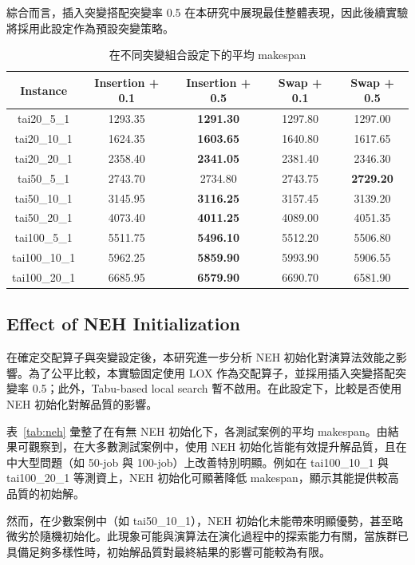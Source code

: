 \documentclass[conference]{IEEEtran}
\begin{document}
綜合而言，插入突變搭配突變率 0.5 在本研究中展現最佳整體表現，因此後續實驗將採用此設定作為預設突變策略。
\begin{table}[H]
\centering
\caption{在不同突變組合設定下的平均 makespan}
\label{tab:mutation_settings}
\begin{tabular}{c|c|c|c|c}
\hline
Instance & Insertion + 0.1 & Insertion + 0.5 & Swap + 0.1 & Swap + 0.5 \\
\hline
tai20\_5\_1   & 1293.35 & \textbf{1291.30} & 1297.80 & 1297.00 \\
tai20\_10\_1  & 1624.35 & \textbf{1603.65} & 1640.80 & 1617.65 \\
tai20\_20\_1  & 2358.40 & \textbf{2341.05} & 2381.40 & 2346.30 \\
tai50\_5\_1   & 2743.70 & 2734.80 & 2743.75 & \textbf{2729.20} \\
tai50\_10\_1  & 3145.95 & \textbf{3116.25} & 3157.45 & 3139.20 \\
tai50\_20\_1  & 4073.40 & \textbf{4011.25} & 4089.00 & 4051.35 \\
tai100\_5\_1  & 5511.75 & \textbf{5496.10} & 5512.20 & 5506.80 \\
tai100\_10\_1 & 5962.25 & \textbf{5859.90} & 5993.90 & 5906.55 \\
tai100\_20\_1 & 6685.95 & \textbf{6579.90} & 6690.70 & 6581.90 \\
\hline
\end{tabular}
\end{table}

\subsection{Effect of NEH Initialization}
在確定交配算子與突變設定後，本研究進一步分析 NEH 初始化對演算法效能之影響。為了公平比較，本實驗固定使用 LOX 作為交配算子，並採用插入突變搭配突變率 0.5；此外，Tabu-based local search 暫不啟用。在此設定下，比較是否使用 NEH 初始化對解品質的影響。

表~\ref{tab:neh} 彙整了在有無 NEH 初始化下，各測試案例的平均 makespan。由結果可觀察到，在大多數測試案例中，使用 NEH 初始化皆能有效提升解品質，且在中大型問題（如 50-job 與 100-job）上改善特別明顯。例如在 tai100\_10\_1 與 tai100\_20\_1 等測資上，NEH 初始化可顯著降低 makespan，顯示其能提供較高品質的初始解。

然而，在少數案例中（如 tai50\_10\_1），NEH 初始化未能帶來明顯優勢，甚至略微劣於隨機初始化。此現象可能與演算法在演化過程中的探索能力有關，當族群已具備足夠多樣性時，初始解品質對最終結果的影響可能較為有限。
\end{document}
